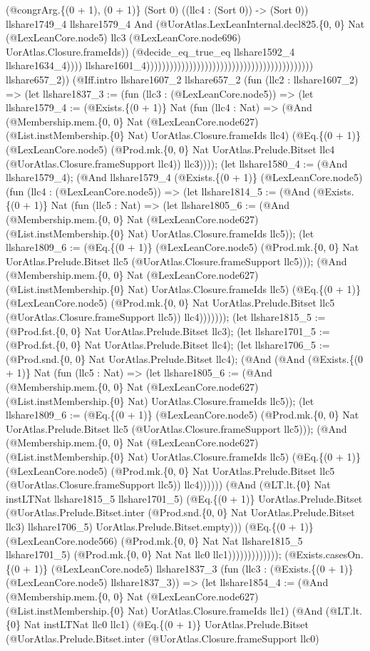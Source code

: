 \documentclass[11pt]{article}
\begin{document}
(@congrArg.\{(0 + 1), (0 + 1)\} (Sort 0) ((llc4 : (Sort 0)) -> (Sort 0)) llshare1749\_4 llshare1579\_4 And (@UorAtlas.LexLeanInternal.decl825.\{0, 0\} Nat (@LexLeanCore.node5) llc3 (@LexLeanCore.node696) UorAtlas.Closure.frameIds)) (@decide\_eq\_true\_eq llshare1592\_4 llshare1634\_4)))) llshare1601\_4))))))))))))))))))))))))))))))))))))))))))) llshare657\_2)) (@Iff.intro llshare1607\_2 llshare657\_2 (fun (llc2 : llshare1607\_2) => (let llshare1837\_3 := (fun (llc3 : (@LexLeanCore.node5)) => (let llshare1579\_4 := (@Exists.\{(0 + 1)\} Nat (fun (llc4 : Nat) => (@And (@Membership.mem.\{0, 0\} Nat (@LexLeanCore.node627) (@List.instMembership.\{0\} Nat) UorAtlas.Closure.frameIds llc4) (@Eq.\{(0 + 1)\} (@LexLeanCore.node5) (@Prod.mk.\{0, 0\} Nat UorAtlas.Prelude.Bitset llc4 (@UorAtlas.Closure.frameSupport llc4)) llc3)))); (let llshare1580\_4 := (@And llshare1579\_4); (@And llshare1579\_4 (@Exists.\{(0 + 1)\} (@LexLeanCore.node5) (fun (llc4 : (@LexLeanCore.node5)) => (let llshare1814\_5 := (@And (@Exists.\{(0 + 1)\} Nat (fun (llc5 : Nat) => (let llshare1805\_6 := (@And (@Membership.mem.\{0, 0\} Nat (@LexLeanCore.node627) (@List.instMembership.\{0\} Nat) UorAtlas.Closure.frameIds llc5)); (let llshare1809\_6 := (@Eq.\{(0 + 1)\} (@LexLeanCore.node5) (@Prod.mk.\{0, 0\} Nat UorAtlas.Prelude.Bitset llc5 (@UorAtlas.Closure.frameSupport llc5))); (@And (@Membership.mem.\{0, 0\} Nat (@LexLeanCore.node627) (@List.instMembership.\{0\} Nat) UorAtlas.Closure.frameIds llc5) (@Eq.\{(0 + 1)\} (@LexLeanCore.node5) (@Prod.mk.\{0, 0\} Nat UorAtlas.Prelude.Bitset llc5 (@UorAtlas.Closure.frameSupport llc5)) llc4))))))); (let llshare1815\_5 := (@Prod.fst.\{0, 0\} Nat UorAtlas.Prelude.Bitset llc3); (let llshare1701\_5 := (@Prod.fst.\{0, 0\} Nat UorAtlas.Prelude.Bitset llc4); (let llshare1706\_5 := (@Prod.snd.\{0, 0\} Nat UorAtlas.Prelude.Bitset llc4); (@And (@And (@Exists.\{(0 + 1)\} Nat (fun (llc5 : Nat) => (let llshare1805\_6 := (@And (@Membership.mem.\{0, 0\} Nat (@LexLeanCore.node627) (@List.instMembership.\{0\} Nat) UorAtlas.Closure.frameIds llc5)); (let llshare1809\_6 := (@Eq.\{(0 + 1)\} (@LexLeanCore.node5) (@Prod.mk.\{0, 0\} Nat UorAtlas.Prelude.Bitset llc5 (@UorAtlas.Closure.frameSupport llc5))); (@And (@Membership.mem.\{0, 0\} Nat (@LexLeanCore.node627) (@List.instMembership.\{0\} Nat) UorAtlas.Closure.frameIds llc5) (@Eq.\{(0 + 1)\} (@LexLeanCore.node5) (@Prod.mk.\{0, 0\} Nat UorAtlas.Prelude.Bitset llc5 (@UorAtlas.Closure.frameSupport llc5)) llc4)))))) (@And (@LT.lt.\{0\} Nat instLTNat llshare1815\_5 llshare1701\_5) (@Eq.\{(0 + 1)\} UorAtlas.Prelude.Bitset (@UorAtlas.Prelude.Bitset.inter (@Prod.snd.\{0, 0\} Nat UorAtlas.Prelude.Bitset llc3) llshare1706\_5) UorAtlas.Prelude.Bitset.empty))) (@Eq.\{(0 + 1)\} (@LexLeanCore.node566) (@Prod.mk.\{0, 0\} Nat Nat llshare1815\_5 llshare1701\_5) (@Prod.mk.\{0, 0\} Nat Nat llc0 llc1))))))))))))); (@Exists.casesOn.\{(0 + 1)\} (@LexLeanCore.node5) llshare1837\_3 (fun (llc3 : (@Exists.\{(0 + 1)\} (@LexLeanCore.node5) llshare1837\_3)) => (let llshare1854\_4 := (@And (@Membership.mem.\{0, 0\} Nat (@LexLeanCore.node627) (@List.instMembership.\{0\} Nat) UorAtlas.Closure.frameIds llc1) (@And (@LT.lt.\{0\} Nat instLTNat llc0 llc1) (@Eq.\{(0 + 1)\} UorAtlas.Prelude.Bitset (@UorAtlas.Prelude.Bitset.inter (@UorAtlas.Closure.frameSupport llc0) 
\end{document}
